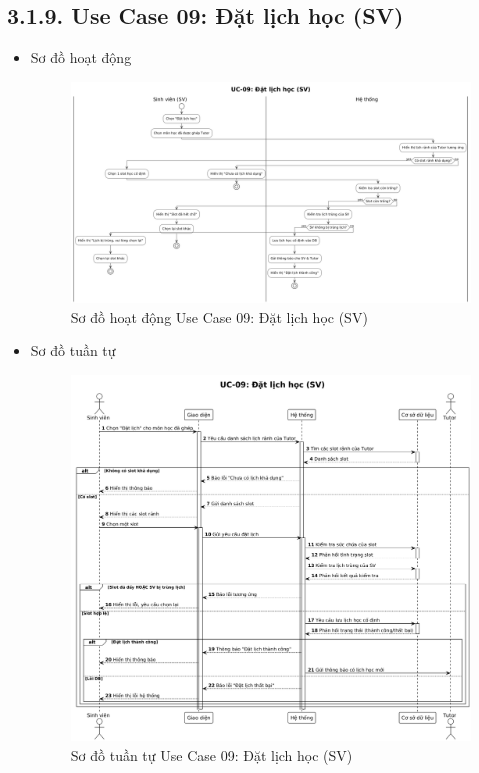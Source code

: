 \subsection*{3.1.9. Use Case 09: Đặt lịch học (SV)}
\begin{itemize}
    \item Sơ đồ hoạt động
    \begin{figure}[H]
    \centering
    \includegraphics[scale=0.3 ]{Picture/ACUC09.png}
    \caption{Sơ đồ hoạt động Use Case 09: Đặt lịch học (SV)}
    \end{figure}
    \item Sơ đồ tuần tự
    \begin{figure}[H]
    \centering
    \includegraphics[scale=0.35 ]{Picture/SEUC09.png}
    \caption{Sơ đồ tuần tự Use Case 09: Đặt lịch học (SV)}
    \end{figure}
\end{itemize}

